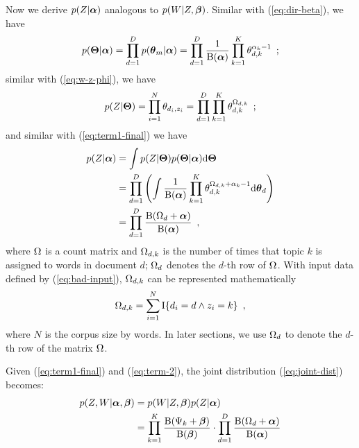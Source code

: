 Now we derive $p(Z|\boldsymbol{\alpha})$ analogous to $p(W|Z,\boldsymbol{\beta})$.
Similar with (\ref{eq:dir-beta}), we have
\begin{equation}
  \label{eq:dir-alpha}
  p(\boldsymbol{\Theta}|\boldsymbol{\alpha})
  =
  \prod_{d=1}^{D}
  p( \boldsymbol{\theta}_{m} | \boldsymbol{\alpha})
  =
  \prod_{d=1}^{D}
  \frac{1}{\operatorname{B}(\boldsymbol{\alpha})}
  \prod_{k=1}^{K} \theta_{d,k}^{\alpha_{k}-1}
  \enspace;
\end{equation}
similar with (\ref{eq:w-z-phi}), we have
\begin{equation}
  \label{eq:z-d-theta}
  p(Z|\boldsymbol{\Theta})
  =
  \prod_{i=1}^N \theta_{d_i,z_i}
  =
  \prod_{d=1}^{D} \prod_{k=1}^{K} \theta_{d,k}^{\Omega_{d,k}}
  \enspace;
\end{equation}
and similar with (\ref{eq:term1-final}) we have
\begin{equation}
  \label{eq:term-2}
  \begin{split}
    p(Z|\boldsymbol{\alpha})
    &=
    \int p(Z|\boldsymbol{\Theta}) p(\boldsymbol{\Theta}|\boldsymbol{\alpha}) \mathrm{d}\boldsymbol{\Theta}
    \\
    &=
    \prod_{d=1}^{D}  \left(
      \int
      \frac{1}{\operatorname{B}(\boldsymbol{\alpha})}
      \prod_{k=1}^{K}
      \theta_{d,k}^{\Omega_{d,k} + \alpha_{k} - 1}
      \mathrm{d} \boldsymbol{\theta}_{d}
    \right)
    \\
    &=
    \prod_{d=1}^{D}
    \frac{\operatorname{B}(\Omega_{d}+\boldsymbol{\alpha})}{\operatorname{B}(\boldsymbol{\alpha})}
    \enspace,
  \end{split}
\end{equation}
where $\Omega_{}$ is a count matrix and $\Omega_{d,k}$ is the number of
times that topic $k$ is assigned to words in document $d$; $\Omega_{d}$
denotes the $d$-th row of $\Omega_{}$.  With input data defined by
(\ref{eq:bad-input}), $\Omega_{d,k}$ can be represented mathematically
\begin{equation}
  \label{eq:n-z-m}
  \Omega_{d,k} = \sum_{i=1}^N \operatorname{I}\{d_i=d \land z_i=k \}
  \enspace,
\end{equation}
where $N$ is the corpus size by words.  In later sections, we use
$\Omega_{d}$ to denote the $d$-th row of the matrix $\Omega_{}$.

Given (\ref{eq:term1-final}) and (\ref{eq:term-2}), the joint
distribution (\ref{eq:joint-dist}) becomes:
\begin{equation}
  \label{eq:joint-dist-final}
  \begin{split}
    p(Z,W|\boldsymbol{\alpha},\boldsymbol{\beta})
    &=
    p(W|Z,\boldsymbol{\beta})
    p(Z|\boldsymbol{\alpha})
    \\
    &=
    \prod_{k=1}^{K}
    \frac{\operatorname{B}(\Psi_{k}+\boldsymbol{\beta})}{\operatorname{B}(\boldsymbol{\beta})}
    \cdot
    \prod_{d=1}^{D}
    \frac{\operatorname{B}(\Omega_{d}+\boldsymbol{\alpha})}{\operatorname{B}(\boldsymbol{\alpha})}
   \end{split}
\end{equation}




